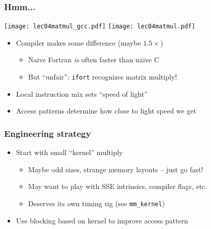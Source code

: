 \documentclass{beamer}
\begin{document}
\begin{frame}
  \frametitle{Hmm...}
  
  \begin{center}
  \texttt{[image: lec04matmul\_gcc.pdf]} 
  \texttt{[image: lec04matmul.pdf]}
  \end{center}

  \begin{itemize}
  \item Compiler makes some difference (maybe $1.5 \times$)
    \begin{itemize}
    \item Naive Fortran {\em is} often faster than naive C
    \item But ``unfair'': {\tt ifort} recognizes matrix multiply!
    \end{itemize}
  \item Local instruction mix sets ``speed of light''
  \item Access patterns determine how close to light speed we get
  \end{itemize}
\end{frame}


\begin{frame}
  \frametitle{Engineering strategy}

  \begin{center}
  \end{center}

  \begin{itemize}
  \item Start with small ``kernel'' multiply
    \begin{itemize}
    \item Maybe odd sizes, strange memory layouts -- just go fast!
    \item May want to play with SSE intrinsics, compiler flags, etc.
    \item Deserves its own timing rig (see {\tt mm\_kernel})
    \end{itemize}
  \item Use blocking based on kernel to improve access pattern
  \end{itemize}
\end{frame}
\end{document}
